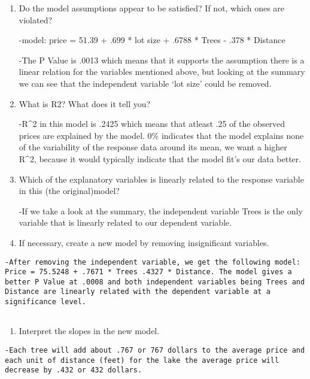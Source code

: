 \documentclass[]{article}
\providecommand{\tightlist}{%
  \setlength{\itemsep}{0pt}\setlength{\parskip}{0pt}}
\begin{document}
\begin{enumerate}
\def\labelenumi{\alph{enumi}.}
\item
  Do the model assumptions appear to be satisfied? If not, which ones
  are violated?

  -model: price = 51.39 + .699 * lot size + .6788 * Trees - .378 *
  Distance

  -The P Value is .0013 which means that it supports the assumption
  there is a linear relation for the variables mentioned above, but
  looking at the summary we can see that the independent variable `lot
  size' could be removed.
\item
  What is R2? What does it tell you?

  -R\^{}2 in this model is .2425 which means that atleast .25 of the
  observed prices are explained by the model. 0\% indicates that the
  model explains none of the variability of the response data around its
  mean, we want a higher R\^{}2, because it would typically indicate
  that the model fit's our data better.
\item
  Which of the explanatory variables is linearly related to the response
  variable in this (the original)model?

  -If we take a look at the summary, the independent variable Trees is
  the only variable that is linearly related to our dependent variable.
\item
  If necessary, create a new model by removing insignificant variables.
\end{enumerate}

\begin{verbatim}
-After removing the independent variable, we get the following model: Price = 75.5248 + .7671 * Trees .4327 * Distance. The model gives a better P Value at .0008 and both independent variables being Trees and Distance are linearly related with the dependent variable at a significance level.
 
\end{verbatim}

\begin{enumerate}
\def\labelenumi{\alph{enumi}.}
\setcounter{enumi}{4}
\tightlist
\item
  Interpret the slopes in the new model.
\end{enumerate}

\begin{verbatim}
-Each tree will add about .767 or 767 dollars to the average price and each unit of distance (feet) for the lake the average price will decrease by .432 or 432 dollars.
\end{verbatim}
\end{document}
